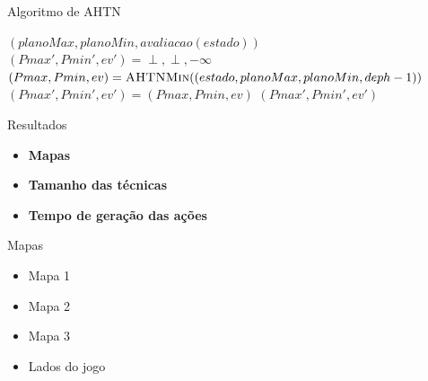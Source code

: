\documentclass{beamer}
\begin{document}
\begin{frame}{Algoritmo de AHTN}
	\vspace{5mm}
	{\footnotesize
	\begin{algorithmic}[1]		
		 \label{alg:meuahtn:terminal}
		\State	\Return $(planoMax, planoMin, avaliacao(estado))$
		\EndIf
		 \label{alg:meuahtn:nexaction}
		\State $(Pmax', Pmin', ev') = \perp, \perp, -\infty$
		 \label{alg:meuahtn:for}
		\State $(Pmax, Pmin, ev) = \Call{AHTNMin}{(estado, planoMax, planoMin, deph-1)}$ \label{alg:meuahtn:ahtnmin}
		 \label{alg:meuahtn:avali}
		\State $(Pmax', Pmin', ev') = (Pmax, Pmin, ev)$
		\EndIf		 		 		
		\EndFor
		\State \Return $(Pmax', Pmin', ev')$ \label{alg:meuahtn:retorno}
		\EndFunction
	\end{algorithmic}	
	}
\end{frame}

{
	\begin{frame}{Resultados}
		\vspace{5mm}
		\begin{itemize}
			\item \textbf{Mapas}
			\item \textbf{Tamanho das técnicas}
			\item \textbf{Tempo de geração das ações}
		\end{itemize}
	\end{frame}
}
\begin{frame}{Mapas}
	\begin{itemize}
		\item Mapa 1
		\item Mapa 2
		\item Mapa 3
		\item Lados do jogo
	\end{itemize}
\end{frame}
\end{document}
